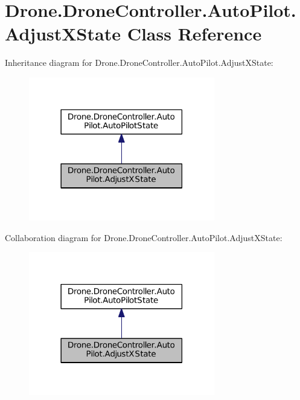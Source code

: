 \hypertarget{class_drone_1_1_drone_controller_1_1_auto_pilot_1_1_adjust_x_state}{}\section{Drone.\+Drone\+Controller.\+Auto\+Pilot.\+Adjust\+X\+State Class Reference}
\label{class_drone_1_1_drone_controller_1_1_auto_pilot_1_1_adjust_x_state}


Inheritance diagram for Drone.\+Drone\+Controller.\+Auto\+Pilot.\+Adjust\+X\+State\+:\nopagebreak
\begin{figure}[H]
\begin{center}
\leavevmode
\includegraphics[width=230pt]{class_drone_1_1_drone_controller_1_1_auto_pilot_1_1_adjust_x_state__inherit__graph}
\end{center}
\end{figure}


Collaboration diagram for Drone.\+Drone\+Controller.\+Auto\+Pilot.\+Adjust\+X\+State\+:\nopagebreak
\begin{figure}[H]
\begin{center}
\leavevmode
\includegraphics[width=230pt]{class_drone_1_1_drone_controller_1_1_auto_pilot_1_1_adjust_x_state__coll__graph}
\end{center}
\end{figure}
